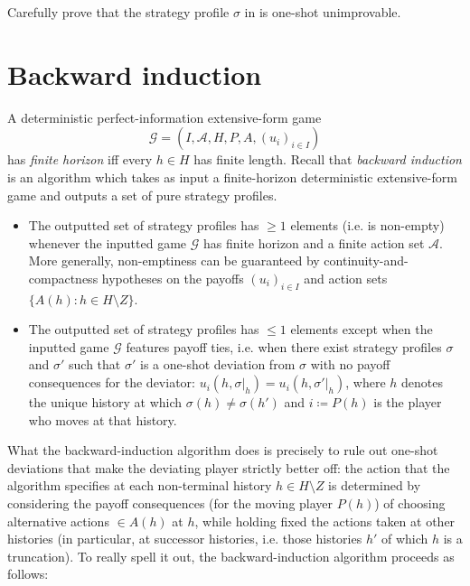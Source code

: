 \begin{exercise}
	\label{exercise:rubinstein_osd}
	Carefully prove that the strategy profile $\sigma$ in  is one-shot unimprovable.
\end{exercise}




\section{Backward induction}
\label{osdp:backward}

A deterministic perfect-information extensive-form game
%
\begin{equation*}
	\mathcal{G}
	= (I,\mathcal{A},H,P,A,(u_i)_{i \in I}) 
\end{equation*}
%
has \emph{finite horizon} iff every $h \in H$ has finite length. Recall that \emph{backward induction} is an algorithm which takes as input a finite-horizon deterministic extensive-form game and outputs a set of pure strategy profiles. 

\begin{itemize}

	\item The outputted set of strategy profiles has $\geq 1$ elements (i.e. is non-empty) whenever the inputted game $\mathcal{G}$ has finite horizon and a finite action set $\mathcal{A}$. More generally, non-emptiness can be guaranteed by continuity-and-compactness hypotheses on the payoffs $(u_i)_{i \in I}$ and action sets $\{ A(h) : h \in H \setminus Z \}$.

	\item The outputted set of strategy profiles has $\leq 1$ elements except when the inputted game $\mathcal{G}$ features payoff ties, i.e. when there exist strategy profiles $\sigma$ and $\sigma'$ such that $\sigma'$ is a one-shot deviation from $\sigma$ with no payoff consequences for the deviator: $u_i(h,\sigma|_h) = u_i(h,\sigma'|_h)$, where $h$ denotes the unique history at which $\sigma(h) \neq \sigma(h')$ and $i \coloneqq P(h)$ is the player who moves at that history.

\end{itemize}

What the backward-induction algorithm does is precisely to rule out one-shot deviations that make the deviating player strictly better off: the action that the algorithm specifies at each non-terminal history $h \in H \setminus Z$ is determined by considering the payoff consequences (for the moving player $P(h)$) of choosing alternative actions $\in A(h)$ at $h$, while holding fixed the actions taken at other histories (in particular, at successor histories, i.e. those histories $h'$ of which $h$ is a truncation). To really spell it out, the backward-induction algorithm proceeds as follows:

